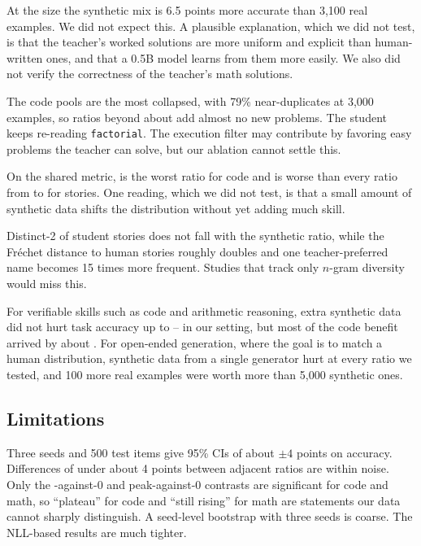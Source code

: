 At the  size the synthetic mix is 6.5 points more accurate than 3,100 real \gsm examples.
We did not expect this.
A plausible explanation, which we did not test, is that the teacher's worked solutions are more uniform and explicit than human-written ones, and that a 0.5B model learns from them more easily.
We also did not verify the correctness of the teacher's math solutions.

The code pools are the most collapsed, with 79\% near-duplicates at 3,000 examples, so ratios beyond about  add almost no new problems.
The student keeps re-reading \texttt{factorial}.
The execution filter may contribute by favoring easy problems the teacher can solve, but our ablation cannot settle this.

On the shared metric,  is the worst ratio for code and is worse than every ratio from  to  for stories.
One reading, which we did not test, is that a small amount of synthetic data shifts the distribution without yet adding much skill.

Distinct-2 of student stories does not fall with the synthetic ratio, while the Fr\'echet distance to human stories roughly doubles and one teacher-preferred name becomes 15 times more frequent.
Studies that track only $n$-gram diversity would miss this.

For verifiable skills such as code and arithmetic reasoning, extra synthetic data did not hurt task accuracy up to -- in our setting, but most of the code benefit arrived by about .
For open-ended generation, where the goal is to match a human distribution, synthetic data from a single generator hurt at every ratio we tested, and 100 more real examples were worth more than 5,000 synthetic ones.

\subsection{Limitations}
\label{sec:limitations}

 Three seeds and 500 test items give 95\% CIs of about $\pm 4$ points on accuracy. Differences of under about 4 points between adjacent ratios are within noise. Only the -against-0 and peak-against-0 contrasts are significant for code and math, so ``plateau'' for code and ``still rising'' for math are statements our data cannot sharply distinguish. A seed-level bootstrap with three seeds is coarse. The NLL-based results are much tighter.


